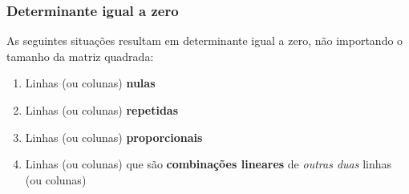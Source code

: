 \documentclass[pdftex, brazil, aspectratio=169]{beamer}
\begin{document}
\begin{frame}[t]
  \frametitle{Determinante igual a zero}
  As seguintes situações resultam em determinante igual a zero, não importando
  o tamanho da matriz quadrada:
    \begin{enumerate}
      \item Linhas (ou colunas) \textbf{nulas}
      \item Linhas (ou colunas) \textbf{repetidas}
      \item Linhas (ou colunas) \textbf{proporcionais}
      \item Linhas (ou colunas) que são \textbf{combinações lineares} de \emph{outras
        duas} linhas (ou colunas)
    \end{enumerate}
\end{frame}
\end{document}
